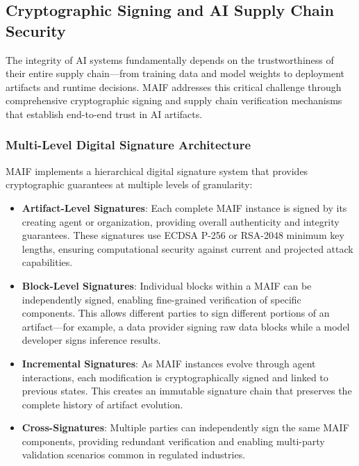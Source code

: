 \documentclass[conference]{IEEEtran}
\begin{document}
\subsection{Cryptographic Signing and AI Supply Chain Security}

The integrity of AI systems fundamentally depends on the trustworthiness of their entire supply chain—from training data and model weights to deployment artifacts and runtime decisions. MAIF addresses this critical challenge through comprehensive cryptographic signing and supply chain verification mechanisms that establish end-to-end trust in AI artifacts.

\subsubsection{Multi-Level Digital Signature Architecture}

MAIF implements a hierarchical digital signature system that provides cryptographic guarantees at multiple levels of granularity:

\begin{itemize}[leftmargin=*]
\item \textbf{Artifact-Level Signatures}: Each complete MAIF instance is signed by its creating agent or organization, providing overall authenticity and integrity guarantees. These signatures use ECDSA P-256 or RSA-2048 minimum key lengths, ensuring computational security against current and projected attack capabilities.

\item \textbf{Block-Level Signatures}: Individual blocks within a MAIF can be independently signed, enabling fine-grained verification of specific components. This allows different parties to sign different portions of an artifact—for example, a data provider signing raw data blocks while a model developer signs inference results.

\item \textbf{Incremental Signatures}: As MAIF instances evolve through agent interactions, each modification is cryptographically signed and linked to previous states. This creates an immutable signature chain that preserves the complete history of artifact evolution.

\item \textbf{Cross-Signatures}: Multiple parties can independently sign the same MAIF components, providing redundant verification and enabling multi-party validation scenarios common in regulated industries.
\end{itemize}
\end{document}
